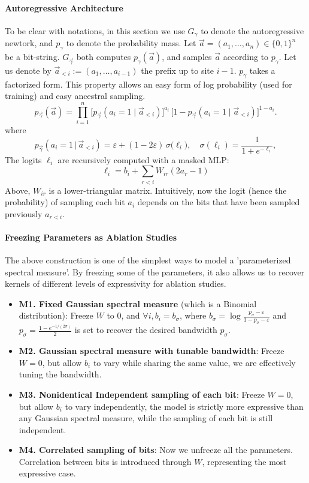 \documentclass[a4paper,onecolumn,notitlepage,nofootinbib,longbibliography,superscriptaddress, floatfix, pra, aps, 10pt]{revtex4-2}
\begin{document}
\paragraph{Autoregressive Architecture}  
To be clear with notations, in this section we use $G_\gamma$ to denote the autoregressive newtork, and $p_\gamma$ to denote the probability mass. Let \(\vec{a}=(a_1,\dots,a_n)\in\{0,1\}^n\) be a bit-string. $G_{\vec{\gamma}}$ both computes $p_\gamma(\vec{a})$, and samples $\vec{a}$ according to $p_\gamma$. Let us denote by \(\vec{a}_{<i}:=(a_1,\dots,a_{i-1})\) the prefix up to site \(i-1\). $p_\gamma$ takes a factorized form. This property allows an easy form of log probability (used for training) and easy ancestral sampling.
\[
p_{\vec\gamma}(\vec{a})=
  \prod_{i=1}^n 
  \bigl[p_{\vec\gamma}(a_i=1\mid\vec{a}_{<i})\bigr]^{a_i}\,
  \bigl[1-p_{\vec\gamma}(a_i=1\mid\vec{a}_{<i})\bigr]^{1-a_i}.
\]
where
\[
p_{\vec\gamma}\!\left(a_i=1\,\big|\,\vec{a}_{<i}\right)
 = \varepsilon+(1-2\varepsilon)\,
   \sigma\!\bigl(\ell_i\bigr), 
\quad
\sigma(\ell_i)=\frac1{1+e^{-\ell_i}},
\]
The logits $\ell_i$ are recursively computed with a masked MLP: 
\[
\ell_i = b_i + \sum_{r<i}W_{ir} (2a_r - 1) 
\]
Above, $W_{ir}$ is a lower-triangular matrix. Intuitively, now the logit (hence the probability) of sampling each bit $a_i$ depends on the bits that have been sampled previously $a_{r<i}$. 

\paragraph{Freezing Parameters as Ablation Studies}
The above construction is one of the simplest ways to model a 'parameterized spectral measure'. By freezing some of the parameters, it also allows us to recover kernels of different levels of expressivity for ablation studies.
\begin{itemize}
    \item \textbf{M1. Fixed Gaussian spectral measure }(which is a Binomial distribution): Freeze $W$ to $0$, and $\forall i, b_i = b_\sigma$, where $b_\sigma=\log\!\frac{p_\sigma-\varepsilon}{1-p_\sigma-\varepsilon}$ and $
p_\sigma=\frac{1-e^{-1/(2\sigma)}}{2}$ is set to recover the desired bandwidth $p_\sigma$.
\item \textbf{M2. Gaussian spectral measure with tunable bandwidth}: Freeze $W=0$, but allow $b_i$ to vary while sharing the same value, we are effectively tuning the bandwidth.
\item \textbf{M3. Nonidentical Independent sampling of each bit}: Freeze $W=0$, but allow $b_i$ to vary independently, the model is strictly more expressive than any Gaussian spectral measure, while the sampling of each bit is still independent.
\item \textbf{M4. Correlated sampling of bits}: Now we unfreeze all the parameters. Correlation between bits is introduced through $W$, representing the most expressive case.
\end{itemize}
\end{document}
